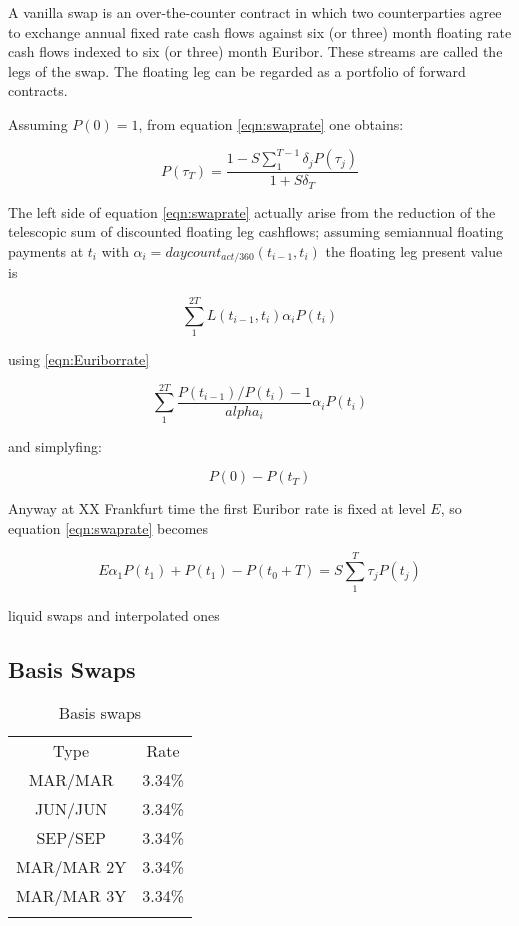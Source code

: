 \documentclass[11pt,reqno]{amsart}
\begin{document}
A vanilla swap is an over-the-counter contract
in which two counterparties agree to exchange annual fixed rate cash
flows against six (or three) month floating rate cash flows indexed to six (or three)
month Euribor. These streams are called the legs of the swap.
The floating leg can be regarded as a portfolio of forward contracts.

Assuming $P(0)=1$, from equation \ref{eqn:swaprate} one obtains:

\begin{equation}
P(\tau_T) = \frac
    {1 - S \sum_1^{T-1} \delta_j P(\tau_j)}
    {1+S \delta_T}
\label{eqn:discfromswaprate}
\end{equation}

The left side of equation \ref{eqn:swaprate} actually arise from
the reduction of the telescopic sum of discounted floating leg cashflows;
assuming semiannual floating payments at $t_i$ with
$\alpha_i=daycount_{act/360}(t_{i-1},t_i) $ the floating leg
present value is

\begin{equation}
\sum_1^{2T} L(t_{i-1},t_i) \alpha_i P(t_i) 
\label{eqn:discfloatlegcf}
\end{equation}

using \ref{eqn:Euriborrate}

\begin{equation}
\sum_1^{2T} \frac{P(t_{i-1}) / P(t_i) - 1}{alpha_i} \alpha_i P(t_i) 
\end{equation}

and simplyfing:

\begin{equation}
P(0)-P(t_T) 
\end{equation}

Anyway at XX Frankfurt time the first Euribor rate is fixed at level $E$, so
equation \ref{eqn:swaprate} becomes

\begin{equation}
E \alpha_1 P(t_1) + P(t_1) - P(t_0+T) = S \sum_1^T \tau_j P(t_j)
\label{eqn:swapratewithfixingeffect}
\end{equation}


liquid swaps and interpolated ones


\subsection{Basis Swaps}

\begin{table}[tbp]
\label{tab:basisSwaps} 
\begin{tabular}{cc}
Type & Rate \\ 
MAR/MAR & 3.34\% \\ 
JUN/JUN & 3.34\% \\ 
SEP/SEP & 3.34\% \\ 
MAR/MAR 2Y & 3.34\% \\ 
MAR/MAR 3Y & 3.34\% \\ 
& 
\end{tabular}%
\caption{Basis swaps}
\end{table}
\end{document}
